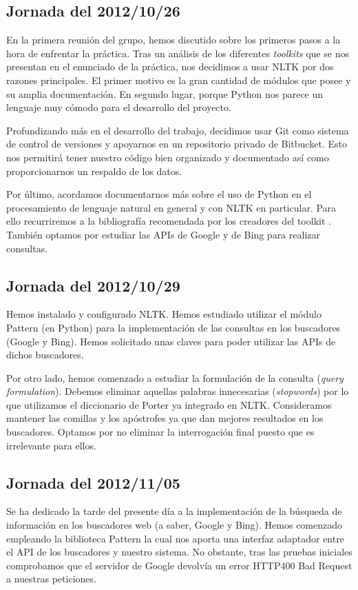 \documentclass[12pt,a4paper,titlepage]{article}
\begin{document}
\subsection{Jornada del 2012/10/26}
En la primera reunión del grupo, hemos discutido sobre los primeros pasos a la hora de enfrentar la práctica. Tras un análisis de los diferentes \emph{toolkits} que se nos presentan en el enunciado de la práctica, nos decidimos a usar NLTK por dos razones principales. El primer motivo es la gran cantidad de módulos que posee y su amplia documentación. En segundo lugar, porque Python nos parece un lenguaje muy cómodo para el desarrollo del proyecto.

Profundizando más en el desarrollo del trabajo, decidimos usar Git como sistema de control de versiones y apoyarnos en un repositorio privado de Bitbucket. Esto nos permitirá tener nuestro código bien organizado y documentado así como proporcionarnos un respaldo de los datos.

Por último, acordamos documentarnos más sobre el uso de Python en el procesamiento de lenguaje natural en general y con NLTK en particular. Para ello recurriremos a la bibliografía recomendada por los creadores del toolkit \cite{nltk-book}. También optamos por estudiar las APIs de Google y de Bing para realizar consultas.

\subsection{Jornada del 2012/10/29}
Hemos instalado y configurado NLTK. Hemos estudiado utilizar el módulo Pattern (en Python) para la implementación de las consultas en los buscadores (Google y Bing). Hemos solicitado unas claves para poder utilizar las APIs de dichos buscadores.

Por otro lado, hemos comenzado a estudiar la formulación de la consulta (\emph{query formulation}). Debemos eliminar aquellas palabras innecesarias (\emph{stopwords}) por lo que utilizamos el diccionario de Porter ya integrado en NLTK. Consideramos mantener las comillas y los apóstrofes ya que dan mejores resultados en los buscadores. Optamos por no eliminar la interrogación final puesto que es irrelevante para ellos.

\subsection{Jornada del 2012/11/05}
Se ha dedicado la tarde del presente día a la implementación de la búsqueda de información en los buscadores web (a saber, Google y Bing). Hemos comenzado empleando la biblioteca Pattern\cite{pattern} la cual nos aporta una interfaz adaptador entre el API de los buscadores y nuestro sistema. No obstante, tras las pruebas iniciales comprobamos que el servidor de Google devolvía un error HTTP400 Bad Request a nuestras peticiones.
\end{document}
